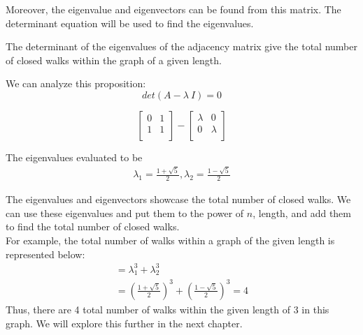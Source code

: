 Moreover, the eigenvalue and eigenvectors can be found from this matrix. The determinant equation will be used to find the eigenvalues. 

\begin{proposition}
    The determinant of the eigenvalues of the adjacency matrix give the total number of closed walks within the graph of a given length.
\end{proposition}

We can analyze this proposition:\\
\begin{equation}
det(A-\lambda~I) = 0 
\end{equation} 


\[
\begin{bmatrix} 
     0        &         1     \\
     1        &         1      \\

\end{bmatrix}
-
\begin{bmatrix}
\lambda &        0 \\
0          &        \lambda\\    

\end{bmatrix}
\]


The eigenvalues evaluated to be 
\begin{align*}
    \lambda_1 = \frac{1+\sqrt{5}}{2}, \lambda_2 = \frac{1-\sqrt{5}}{2}
\end{align*}

\par The eigenvalues and eigenvectors showcase the total number of closed walks. We can use these eigenvalues and put them to the power of $n$, length, and add them to find the total number of closed walks. 
\\For example, 
the total number of walks within a graph of the given length is represented below:
\begin{align*}
= \lambda_1^3+\lambda_2^3 \\
= (\frac{1+\sqrt{5}}{2})^3 + (\frac{1-\sqrt{5}}{2})^3 = 4
\end{align*}
Thus, there are 4 total number of walks within the given length of 3 in this graph. We will explore this further in the next chapter.

